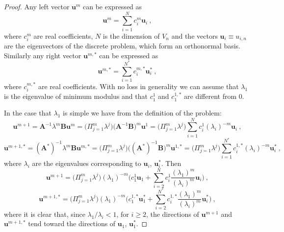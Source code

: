 \documentclass[preprint,12pt]{elsarticle}
\begin{document}
\begin{proof}

Any left vector $\mathbf{u}^m$ can be expressed as 
$$
\mathbf{u}^m=\sum_{i=1}^N c_i^m \mathbf{u}_i\ ,
$$
where $c_i^m$ are real coefficients, $N$ is the dimension of $V_n$ and the vectors $\mathbf{u}_i\equiv u_{i,n}$ are the eigenvectors of the discrete problem, which form an orthonormal basis.
Similarly any right vector $\mathbf{u}^{m,*}$ can be expressed as 
$$
\mathbf{u}^{m,*}=\sum_{i=1}^{N^*} c_i^{m,*} \mathbf{u}_i^*\ ,
$$
where $c_i^{m,*}$ are real coefficients.
With no loss in generality we can assume that $\lambda_1$ is the eigenvalue of minimum modulus and that $c_1^1$ and $c_1^{1,*}$ are different from 0.

In the case that $\lambda_1$ is simple we have from the definition of the problem:
$$
\mathbf{u}^{m+1}=\mathbf{A}^{-1}\lambda^m\mathbf{B}\mathbf{u}^{m}
=\Big(\Pi_{j=1}^m\lambda^{j}\Big)\Big(\mathbf{A}^{-1}\mathbf{B}\Big)^m\mathbf{u}^1
=\Big(\Pi_{j=1}^m\lambda^{j}\Big)\sum_{i=1}^N c_i^1 (\lambda_i)^{-m}\mathbf{u}_i\ ,
$$
$$
\mathbf{u}^{m+1,*}=(\mathbf{A}^*)^{-1}\lambda^m\mathbf{B}\mathbf{u}^{m,*}
=\Big(\Pi_{j=1}^m\lambda^{j}\Big)\Big((\mathbf{A}^*)^{-1}\mathbf{B}\Big)^m\mathbf{u}^{1,*}
=\Big(\Pi_{j=1}^m\lambda^{j}\Big)\sum_{i=1}^{N^*} c_i^{1,*} (\lambda_i)^{-m}\mathbf{u}_i^*\ ,
$$
where $\lambda_i$ are the eigenvalues corresponding to $\mathbf{u}_i$, $\mathbf{u}_i^*$.
Then
\begin{equation}\label{eq:picard_proof_1}
\mathbf{u}^{m+1}=\Big(\Pi_{j=1}^m\lambda^{j}\Big)(\lambda_1)^{-m}\Big( c_1^1 \mathbf{u}_1 +
\sum_{i=2}^N c_i^1\frac{(\lambda_1)^m}{(\lambda_i)^{m}}\mathbf{u}_i\Big) \ ,
\end{equation}
\begin{equation}\label{eq:picard_proof_2}
\mathbf{u}^{m+1,*}=\Big(\Pi_{j=1}^m\lambda^{j}\Big)(\lambda_1)^{-m}\Big( c_1^{1,*} \mathbf{u}_1^* +
\sum_{i=2}^{N^*} c_i^{1,*}\frac{(\lambda_1)^m}{(\lambda_i)^{m}}\mathbf{u}_i^*\Big) \ ,
\end{equation}
where it is clear that, since $\lambda_1/\lambda_i<1$, for $i\ge 2$, the directions of $\mathbf{u}^{m+1}$ and $\mathbf{u}^{m+1,*}$ tend toward the directions of $\mathbf{u}_1$, $\mathbf{u}_1^*$.


\end{proof}
\end{document}
